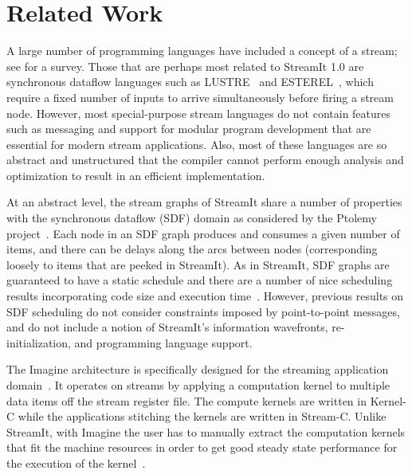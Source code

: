 \section{Related Work}
\label{sec:related}
A large number of programming languages have included a concept of a
stream; see \cite{survey97} for a survey.  Those that are perhaps most
related to StreamIt 1.0 are synchronous dataflow languages such as
LUSTRE~\cite{lustre} and ESTEREL~\cite{esterel92}, which require a fixed
number of inputs to arrive simultaneously before firing a stream node.
However, most special-purpose stream languages do not contain features
such as messaging and support for modular program development that are
essential for modern stream applications.  Also, most of these languages
are so abstract and unstructured that the compiler cannot perform enough
analysis and optimization to result in an efficient implementation.

At an abstract level, the stream graphs of StreamIt share a number of
properties with the synchronous dataflow (SDF) domain as considered by
the Ptolemy project~\cite{ptolemyoverview}.  Each node in an SDF graph
produces and consumes a given number of items, and there can be delays
along the arcs between nodes (corresponding loosely to items that are
peeked in StreamIt).  As in StreamIt, SDF graphs are guaranteed to
have a static schedule and there are a number of nice scheduling
results incorporating code size and execution time~\cite{leesdf}.
However, previous results on SDF scheduling do not consider
constraints imposed by point-to-point messages, and do not include a
notion of StreamIt's information wavefronts, re-initialization, and
programming language support.

The Imagine architecture is specifically designed for the streaming
application domain~\cite{rixner98bandwidthefficient}.  It operates on
streams by applying a computation kernel to multiple data items off
the stream register file.  The compute kernels are written in Kernel-C
while the applications stitching the kernels are written in Stream-C.
Unlike StreamIt, with Imagine the user has to manually extract the
computation kernels that fit the machine resources in order to get
good steady state performance for the execution of the
kernel~\cite{kapasi:2001:ss}.
